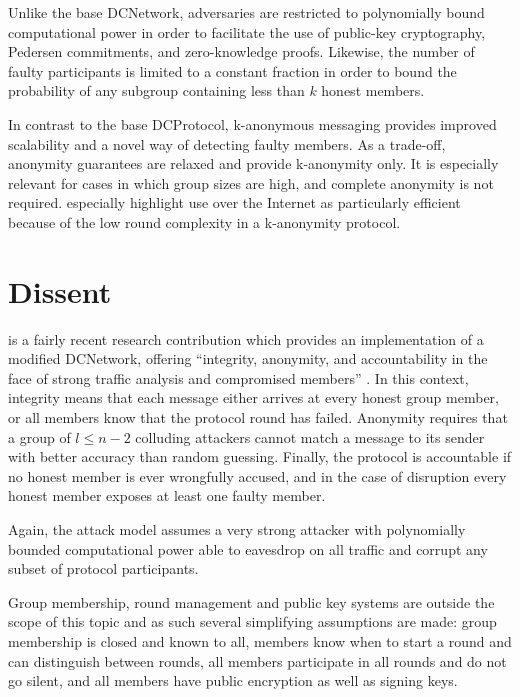 Unlike the base \ac{DCNetwork}, adversaries are restricted to polynomially bound computational
power in order to facilitate the use of public-key cryptography, Pedersen commitments, and zero-knowledge
proofs. Likewise, the number of faulty participants is limited to a constant fraction in order
to bound the probability of any subgroup containing less than $k$ honest members.

In contrast to the base \ac{DCProtocol}, k-anonymous messaging provides improved scalability and
a novel way of detecting faulty members. As a trade-off, anonymity guarantees are relaxed
and provide k-anonymity only. It is especially relevant for cases in which group sizes are high,
and complete anonymity is not required. \citeauthor{von2003k} especially highlight use over the
Internet as particularly efficient because of the low round complexity in a k-anonymity protocol.

\section{Dissent} \label{sec:dissent}

\Dissent is a fairly recent research contribution which provides an implementation of a modified \ac{DCNetwork},
offering ``integrity, anonymity, and accountability in the face of strong traffic analysis and compromised members'' \cite{journals/corr/abs-1004-3057}. In this context, integrity means that each message either
arrives at every honest group member, or all members know that the protocol round has failed. Anonymity
requires that a group of $l \leq n - 2$ colluding attackers cannot match a message to its sender
with better accuracy than random guessing. Finally, the protocol is accountable if no honest member is
ever wrongfully accused, and in the case of disruption every honest member exposes at least one faulty member.

Again, the attack model assumes a very strong attacker with polynomially bounded computational
power able to eavesdrop on all traffic and corrupt any subset of protocol participants.

Group membership, round management and public key systems are outside
the scope of this topic and as such several simplifying assumptions are made: group membership is closed
and known to all, members
know when to start a round and can distinguish between rounds, all members participate in all rounds
and do not go silent, and all members have public encryption as well as signing keys.

